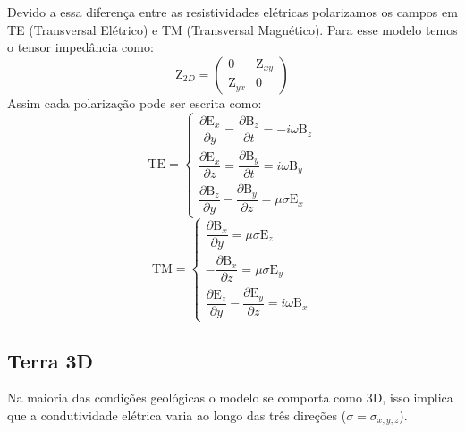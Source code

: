	    
	    
	    
	    Devido a essa diferença entre as resistividades elétricas polarizamos os campos em TE (Transversal Elétrico) e TM (Transversal Magnético).
	    Para esse modelo temos o tensor impedância como:
	    \begin{equation}
	     \textrm{Z}_{2D} = \left (\begin{array}{cc}
	                               0 & \textrm{Z}_{xy} \\
	                               \textrm{Z}_{yx} & 0
	                              \end{array} \right)
	    \end{equation}
	    Assim cada polarização pode ser escrita como:
	    \begin{equation}
	     \textrm{TE} = \left \{ \begin{array}{l}
	            \dfrac{\partial \textrm{E}_x}{\partial y} = \dfrac{\partial \textrm{B}_z}{\partial t} = -i\omega \textrm{B}_z \\[10pt]
	           \dfrac{\partial \textrm{E}_x}{\partial z} = \dfrac{\partial \textrm{B}_y}{\partial t} = i\omega \textrm{B}_y \\[10pt]
	           \dfrac{\partial \textrm{B}_z}{\partial y} - \dfrac{\partial \textrm{B}_y}{\partial z} = \mu \sigma \textrm{E}_x 
	           \end{array} \right.
	    \end{equation}
	    \begin{equation}
	     \textrm{TM} = \left \{ \begin{array}{l}
	            \dfrac{\partial \textrm{B}_x}{\partial y} = \mu \sigma \textrm{E}_z \\[10pt]
	           -\dfrac{\partial \textrm{B}_x}{\partial z} = \mu \sigma \textrm{E}_y \\[10pt]
	           \dfrac{\partial \textrm{E}_z}{\partial y} - \dfrac{\partial \textrm{E}_y}{\partial z} = i \omega \textrm{B}_x 
	           \end{array} \right.
	    \end{equation}
        
        
        \subsection{Terra 3D}
        Na maioria das condições geológicas o modelo se comporta como 3D, isso implica que a 
	    condutividade elétrica varia ao longo das três direções ($\sigma = \sigma_{x,y,z}$).
	    
